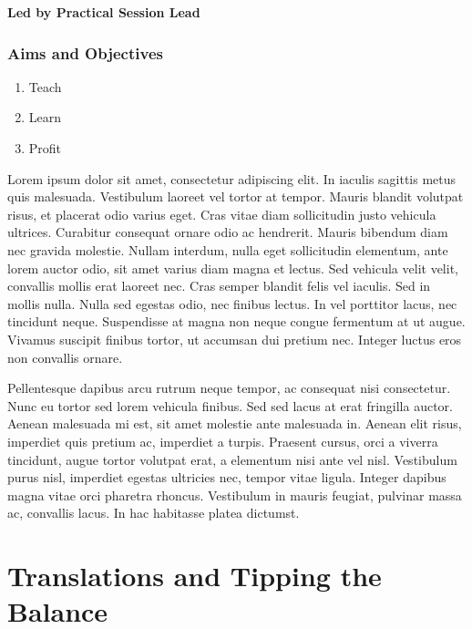 \documentclass[12pt,]{book}
\providecommand{\tightlist}{%
  \setlength{\itemsep}{0pt}\setlength{\parskip}{0pt}}
\begin{document}
\textbf{Led by Practical Session Lead}

\subsection*{Aims and Objectives}\label{aims-and-objectives-6}

\begin{enumerate}
\def\labelenumi{\arabic{enumi}.}
\tightlist
\item
  Teach
\item
  Learn
\item
  Profit
\end{enumerate}

Lorem ipsum dolor sit amet, consectetur adipiscing elit. In iaculis
sagittis metus quis malesuada. Vestibulum laoreet vel tortor at tempor.
Mauris blandit volutpat risus, et placerat odio varius eget. Cras vitae
diam sollicitudin justo vehicula ultrices. Curabitur consequat ornare
odio ac hendrerit. Mauris bibendum diam nec gravida molestie. Nullam
interdum, nulla eget sollicitudin elementum, ante lorem auctor odio, sit
amet varius diam magna et lectus. Sed vehicula velit velit, convallis
mollis erat laoreet nec. Cras semper blandit felis vel iaculis. Sed in
mollis nulla. Nulla sed egestas odio, nec finibus lectus. In vel
porttitor lacus, nec tincidunt neque. Suspendisse at magna non neque
congue fermentum at ut augue. Vivamus suscipit finibus tortor, ut
accumsan dui pretium nec. Integer luctus eros non convallis ornare.

Pellentesque dapibus arcu rutrum neque tempor, ac consequat nisi
consectetur. Nunc eu tortor sed lorem vehicula finibus. Sed sed lacus at
erat fringilla auctor. Aenean malesuada mi est, sit amet molestie ante
malesuada in. Aenean elit risus, imperdiet quis pretium ac, imperdiet a
turpis. Praesent cursus, orci a viverra tincidunt, augue tortor volutpat
erat, a elementum nisi ante vel nisl. Vestibulum purus nisl, imperdiet
egestas ultricies nec, tempor vitae ligula. Integer dapibus magna vitae
orci pharetra rhoncus. Vestibulum in mauris feugiat, pulvinar massa ac,
convallis lacus. In hac habitasse platea dictumst.

\chapter*{Translations and Tipping the
Balance}\label{translations-and-tipping-the-balance}
\end{document}
